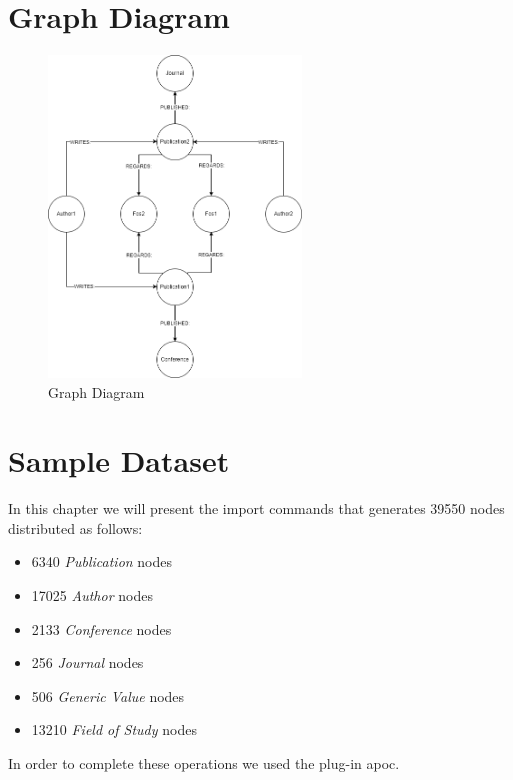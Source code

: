 \documentclass{Configuration_Files/PoliMi3i_thesis}
\begin{document}
\chapter{Graph Diagram}
\begin{figure}[H]
    \centering
    \includegraphics[width=0.6\textwidth]{graphDiagram.png}
    \caption{Graph Diagram}
    \label{fig:graphDiagram}
\end{figure}

\chapter{Sample Dataset}
In this chapter we will present the import commands that generates 39550 nodes distributed as follows:
\begin{itemize}
    \item 6340 \emph{Publication} nodes
    \item 17025 \emph{Author} nodes
    \item 2133 \emph{Conference} nodes
    \item 256 \emph{Journal} nodes
    \item 506 \emph{Generic Value} nodes
    \item 13210 \emph{Field of Study} nodes
\end{itemize}
In order to complete these operations we used the plug-in apoc.
\end{document}
